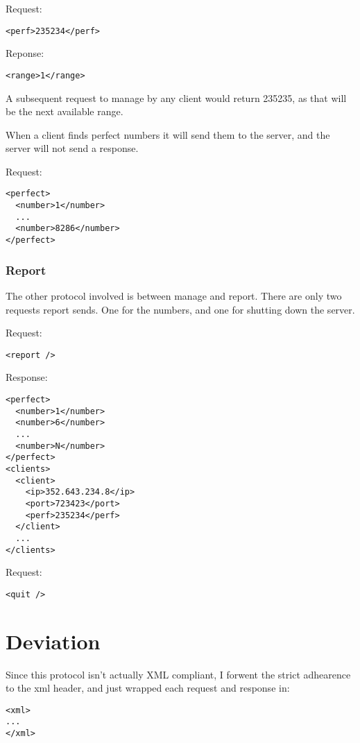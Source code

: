 \documentclass[letterpaper,10pt]{article}
\begin{document}
Request:
\begin{verbatim}
<perf>235234</perf>
\end{verbatim}

Reponse:
\begin{verbatim}
<range>1</range>
\end{verbatim}

A subsequent request to manage by any client would return 235235, as
that will be the next available range.

When a client finds perfect numbers it will send them to the server, and
the server will not send a response.

Request:
\begin{verbatim}
<perfect>
  <number>1</number>
  ...
  <number>8286</number>
</perfect>
\end{verbatim}

\subsubsection*{Report}
The other protocol involved is between manage and report. There are only
two requests report sends. One for the numbers, and one for shutting
down the server.

Request:
\begin{verbatim}
<report />
\end{verbatim}

Response:
\begin{verbatim}
<perfect>
  <number>1</number>
  <number>6</number>
  ...
  <number>N</number>
</perfect>
<clients>
  <client>
    <ip>352.643.234.8</ip>
    <port>723423</port>
    <perf>235234</perf>
  </client>
  ...
</clients>
\end{verbatim}

Request:
\begin{verbatim}
<quit />
\end{verbatim}

\section{Deviation}
Since this protocol isn't actually XML compliant, I forwent the strict
adhearence to the xml header, and just wrapped each request and response
in:
\begin{verbatim}
<xml>
...
</xml>
\end{verbatim}
\end{document}
